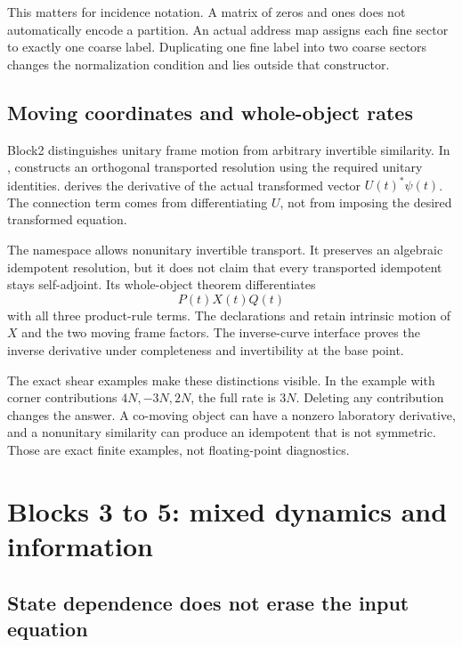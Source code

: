 This matters for incidence notation. A matrix of zeros and ones does not automatically encode a partition. An actual address map assigns each fine sector to exactly one coarse label. Duplicating one fine label into two coarse sectors changes the normalization condition and lies outside that constructor.

\subsection{Moving coordinates and whole-object rates}

Block2 distinguishes unitary frame motion from arbitrary invertible similarity. In ,  constructs an orthogonal transported resolution using the required unitary identities.  derives the derivative of the actual transformed vector \(U(t)^*\psi(t)\). The connection term comes from differentiating \(U\), not from imposing the desired transformed equation.

The namespace  allows nonunitary invertible transport. It preserves an algebraic idempotent resolution, but it does not claim that every transported idempotent stays self-adjoint. Its whole-object theorem differentiates
\[
 P(t)X(t)Q(t)
\]
with all three product-rule terms. The declarations  and  retain intrinsic motion of \(X\) and the two moving frame factors. The inverse-curve interface  proves the inverse derivative under completeness and invertibility at the base point.

The exact shear examples make these distinctions visible. In the example with corner contributions \(4N,-3N,2N\), the full rate is \(3N\). Deleting any contribution changes the answer. A co-moving object can have a nonzero laboratory derivative, and a nonunitary similarity can produce an idempotent that is not symmetric. Those are exact finite examples, not floating-point diagnostics.

\section{Blocks 3 to 5: mixed dynamics and information}

\subsection{State dependence does not erase the input equation}

